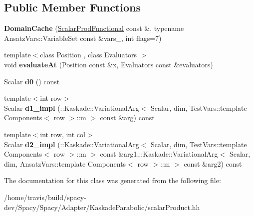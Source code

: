 \subsection*{Public Member Functions}
\begin{DoxyCompactItemize}
\item 
\hypertarget{classSpacy_1_1KaskadeParabolic_1_1OCP_1_1ScalarProdFunctional_1_1DomainCache_afca00f39ddfd0ace49a3bd86bc3958aa}{{\bfseries Domain\-Cache} (\hyperlink{classSpacy_1_1KaskadeParabolic_1_1OCP_1_1ScalarProdFunctional}{Scalar\-Prod\-Functional} const \&, typename Ansatz\-Vars\-::\-Variable\-Set const \&vars\-\_\-, int flags=7)}\label{classSpacy_1_1KaskadeParabolic_1_1OCP_1_1ScalarProdFunctional_1_1DomainCache_afca00f39ddfd0ace49a3bd86bc3958aa}

\item 
\hypertarget{classSpacy_1_1KaskadeParabolic_1_1OCP_1_1ScalarProdFunctional_1_1DomainCache_a3424339738a6ef573c90802791ee23fb}{{\footnotesize template$<$class Position , class Evaluators $>$ }\\void {\bfseries evaluate\-At} (Position const \&x, Evaluators const \&evaluators)}\label{classSpacy_1_1KaskadeParabolic_1_1OCP_1_1ScalarProdFunctional_1_1DomainCache_a3424339738a6ef573c90802791ee23fb}

\item 
\hypertarget{classSpacy_1_1KaskadeParabolic_1_1OCP_1_1ScalarProdFunctional_1_1DomainCache_a054390543a3986831f097636db374d49}{Scalar {\bfseries d0} () const }\label{classSpacy_1_1KaskadeParabolic_1_1OCP_1_1ScalarProdFunctional_1_1DomainCache_a054390543a3986831f097636db374d49}

\item 
\hypertarget{classSpacy_1_1KaskadeParabolic_1_1OCP_1_1ScalarProdFunctional_1_1DomainCache_ac98f4769170c8edf3c3963ae8457e145}{{\footnotesize template$<$int row$>$ }\\Scalar {\bfseries d1\-\_\-impl} (\-::Kaskade\-::\-Variational\-Arg$<$ Scalar, dim, Test\-Vars\-::template Components$<$ row $>$\-::m $>$ const \&arg) const }\label{classSpacy_1_1KaskadeParabolic_1_1OCP_1_1ScalarProdFunctional_1_1DomainCache_ac98f4769170c8edf3c3963ae8457e145}

\item 
\hypertarget{classSpacy_1_1KaskadeParabolic_1_1OCP_1_1ScalarProdFunctional_1_1DomainCache_ab98fe83de196e31f1b0376bbc1be11d7}{{\footnotesize template$<$int row, int col$>$ }\\Scalar {\bfseries d2\-\_\-impl} (\-::Kaskade\-::\-Variational\-Arg$<$ Scalar, dim, Test\-Vars\-::template Components$<$ row $>$\-::m $>$ const \&arg1,\-::Kaskade\-::\-Variational\-Arg$<$ Scalar, dim, Ansatz\-Vars\-::template Components$<$ row $>$\-::m $>$ const \&arg2) const }\label{classSpacy_1_1KaskadeParabolic_1_1OCP_1_1ScalarProdFunctional_1_1DomainCache_ab98fe83de196e31f1b0376bbc1be11d7}

\end{DoxyCompactItemize}


The documentation for this class was generated from the following file\-:\begin{DoxyCompactItemize}
\item 
/home/travis/build/spacy-\/dev/\-Spacy/\-Spacy/\-Adapter/\-Kaskade\-Parabolic/scalar\-Product.\-hh\end{DoxyCompactItemize}
